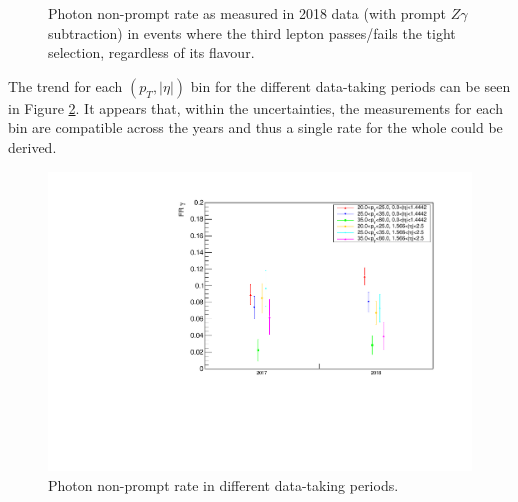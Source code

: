 \begin{figure}
\caption{Photon non-prompt rate as measured in 2018 data (with prompt $Z\gamma$ subtraction) in events where the third lepton passes/fails the tight selection, regardless of its flavour.}
\label{fig:phFR_PF}
\end{figure}

The trend for each $(p_{T}, |\eta|)$ bin for the different data-taking periods can be seen in Figure \ref{fig:phFR_time}.
It appears that, within the uncertainties, the measurements for each bin are compatible across the years and thus a single rate for the whole  could be derived.

\begin{figure}
\centering
\includegraphics[width=.5\textwidth]{Figures/FR_VLtoL_pt-aeta_data-ZGToLLG_time.pdf}
\caption{Photon non-prompt rate in different data-taking periods.}
\label{fig:phFR_time}
\end{figure}

